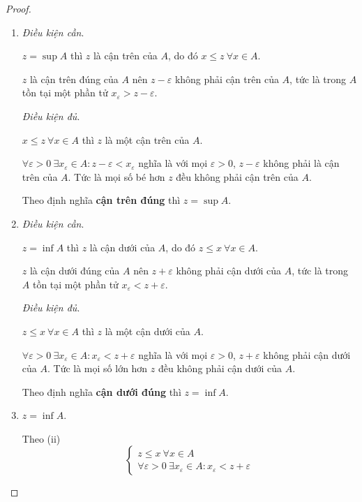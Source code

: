 \documentclass[class=analysis,crop=false]{standalone}
\begin{document}
\begin{proof}
    \begin{enumerate}[label = (\roman*)]
        \item\textit{Điều kiện cần}.
        \par $z = \sup A$ thì $z$ là cận trên của $A$, do đó $x\le z\ \forall x\in A$.
        \par $z$ là cận trên đúng của $A$ nên $z - \varepsilon$ không phải cận trên của $A$, tức là trong $A$ tồn tại một phần tử $x_{\varepsilon} > z - \varepsilon$.
        \par\textit{Điều kiện đủ}.
        \par $x\le z\ \forall x\in A$ thì $z$ là một cận trên của $A$.
        \par $\forall\varepsilon > 0\ \exists x_{\varepsilon}\in A : z - \varepsilon < x_{\varepsilon}$ nghĩa là với mọi $\varepsilon > 0$, $z - \varepsilon$ không phải là cận trên của $A$. Tức là mọi số bé hơn $z$ đều không phải cận trên của $A$.
        \par Theo định nghĩa \textbf{cận trên đúng} thì $z = \sup A$.
        \item\textit{Điều kiện cần}.
        \par $z = \inf A$ thì $z$ là cận dưới của $A$, do đó $z\le x\ \forall x\in A$.
        \par $z$ là cận dưới đúng của $A$ nên $z + \varepsilon$ không phải cận dưới của $A$, tức là trong $A$ tồn tại một phần tử $x_{\varepsilon} < z + \varepsilon$.
        \par\textit{Điều kiện đủ}.
        \par $z\le x\ \forall x\in A$ thì $z$ là một cận dưới của $A$.
        \par $\forall\varepsilon > 0\ \exists x_{\varepsilon}\in A : x_{\varepsilon} < z + \varepsilon$ nghĩa là với mọi $\varepsilon > 0$, $z + \varepsilon$ không phải cận dưới của $A$. Tức là mọi số lớn hơn $z$ đều không phải cận dưới của $A$.
        \par Theo định nghĩa \textbf{cận dưới đúng} thì $z = \inf A$.
        \item $z = \inf A$.
              \par Theo (ii)
              \[
                  \begin{cases}
                      z\le x\ \forall x\in A \\
                      \forall\varepsilon > 0\ \exists x_{\varepsilon}\in A : x_{\varepsilon} < z + \varepsilon
                  \end{cases}
\]
\end{enumerate}
\end{proof}
\end{document}
